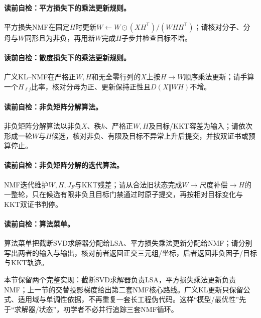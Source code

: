\paragraph{读前自检：平方损失下的乘法更新规则。}平方损失NMF在固定$H$时更新$W\leftarrow W\odot(XH^{\mathsf T})/(WHH^{\mathsf T})$；请核对分子、分母与$W$同形且为非负，再用新$W$完成$H$子步并检查目标不增。\par
\paragraph{读前自检：散度损失下的乘法更新规则。}广义KL--NMF在严格正$W,H$和无全零行列的$X$上按$H\to W$顺序乘法更新；请手算一个$H_{\ell j}$比率，核对分母为正、更新保持正性且$D(X\Vert WH)$不增。\par
\paragraph{读前自检：非负矩阵分解算法。}非负矩阵分解算法以非负$X$、秩$k$、严格正$W,H$及目标/KKT容差为输入；请依次形成一轮$W$与$H$候选，核对非负、有限及目标不异常上升后提交，并按双证书或预算停止。\par
\paragraph{读前自检：非负矩阵分解的迭代算法。}NMF迭代维护$W,H,J_F$与KKT残差；请从合法旧状态完成$W\to$尺度补偿$\to H$的一整轮，只在候选有限非负且目标门禁通过时原子提交，再按相对目标变化与KKT双证书判停。\par


\paragraph{读前自检：算法菜单。}算法菜单把截断SVD求解器分配给LSA、平方损失乘法更新分配给NMF；请分别写出两者的输入与输出，核对前者返回正交三元组/坐标，后者返回非负因子/目标与KKT轨迹。\par

\begin{keypointbox}[title=算法菜单]
本节保留两个完整实现：截断SVD求解器负责LSA，平方损失乘法更新负责NMF；上一节的交替投影梯度给出第二套NMF核心路线。广义KL更新只保留公式、适用域与单调性依据，不再重复一套长工程伪代码。这样“模型/最优性”先于“求解器/状态”，初学者不必并行追踪三套NMF循环。
\end{keypointbox}

